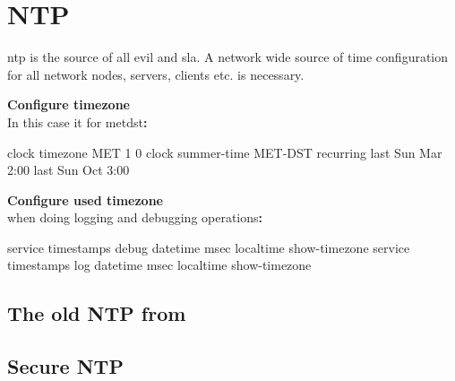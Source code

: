 \chapter{NTP}

\gls{ntp} is the source of all evil and \gls{sla}. A network wide source of time configuration for all network nodes, servers, clients etc. is necessary.

\textbf{Configure timezone}\\In this case it for \gls{metdst}\textbf{:}

\begin{txt}
clock timezone MET 1 0
clock summer-time MET-DST recurring last Sun Mar 2:00 last Sun Oct 3:00
\end{txt}

\textbf{Configure used timezone}\\when doing logging and debugging operations\textbf{:}

\begin{txt}
service timestamps debug datetime msec localtime show-timezone
service timestamps log datetime msec localtime show-timezone
\end{txt}

\section{The old NTP from }

\section{Secure NTP}


